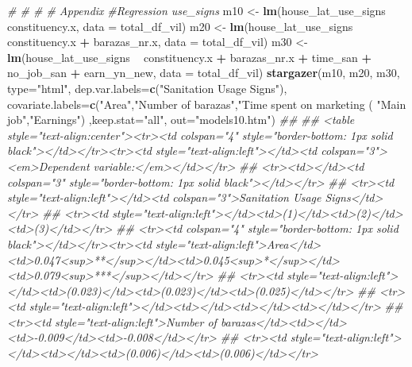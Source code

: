 \documentclass[
]{article}
\newenvironment{Shaded}{\begin{snugshade}}{\end{snugshade}}
\newcommand{\CommentTok}[1]{\textcolor[rgb]{0.56,0.35,0.01}{\textit{#1}}}
\newcommand{\DataTypeTok}[1]{\textcolor[rgb]{0.13,0.29,0.53}{#1}}
\newcommand{\KeywordTok}[1]{\textcolor[rgb]{0.13,0.29,0.53}{\textbf{#1}}}
\newcommand{\NormalTok}[1]{#1}
\newcommand{\OperatorTok}[1]{\textcolor[rgb]{0.81,0.36,0.00}{\textbf{#1}}}
\newcommand{\StringTok}[1]{\textcolor[rgb]{0.31,0.60,0.02}{#1}}
\begin{document}
\begin{Shaded}
\begin{Highlighting}[]
{{{{ \CommentTok{# # # # Appendix}
\CommentTok{#Regression use_signs}
\NormalTok{m10 <-}\StringTok{ }\KeywordTok{lm}\NormalTok{(house_lat_use_signs }\OperatorTok{~}\StringTok{ }\NormalTok{constituency.x,}
          \DataTypeTok{data =}\NormalTok{ total_df_vil)}
\NormalTok{m20 <-}\StringTok{ }\KeywordTok{lm}\NormalTok{(house_lat_use_signs }\OperatorTok{~}\StringTok{ }\NormalTok{constituency.x }\OperatorTok{+}\StringTok{ }\NormalTok{barazas_nr.x,}
          \DataTypeTok{data =}\NormalTok{ total_df_vil)}
\NormalTok{m30 <-}\StringTok{ }\KeywordTok{lm}\NormalTok{(house_lat_use_signs }\OperatorTok{~}\StringTok{ }\NormalTok{constituency.x }\OperatorTok{+}\StringTok{ }\NormalTok{barazas_nr.x }\OperatorTok{+}\StringTok{ }\NormalTok{time_san }\OperatorTok{+}\StringTok{ }\NormalTok{no_job_san }\OperatorTok{+}\StringTok{ }\NormalTok{earn_yn_new,}
          \DataTypeTok{data =}\NormalTok{ total_df_vil)}
\KeywordTok{stargazer}\NormalTok{(m10, m20, m30, }\DataTypeTok{type=}\StringTok{"html"}\NormalTok{,}
          \DataTypeTok{dep.var.labels=}\KeywordTok{c}\NormalTok{(}\StringTok{"Sanitation Usage Signs"}\NormalTok{),}
          \DataTypeTok{covariate.labels=}\KeywordTok{c}\NormalTok{(}\StringTok{"Area"}\NormalTok{,}\StringTok{"Number of barazas"}\NormalTok{,}\StringTok{"Time spent on marketing (%) "}\NormalTok{,}
                             \StringTok{"Main job"}\NormalTok{,}\StringTok{"Earnings"}\NormalTok{) ,}\DataTypeTok{keep.stat=}\StringTok{"all"}\NormalTok{, }\DataTypeTok{out=}\StringTok{"models10.htm"}\NormalTok{)}
\CommentTok{## }
\CommentTok{## <table style="text-align:center"><tr><td colspan="4" style="border-bottom: 1px solid black"></td></tr><tr><td style="text-align:left"></td><td colspan="3"><em>Dependent variable:</em></td></tr>}
\CommentTok{## <tr><td></td><td colspan="3" style="border-bottom: 1px solid black"></td></tr>}
\CommentTok{## <tr><td style="text-align:left"></td><td colspan="3">Sanitation Usage Signs</td></tr>}
\CommentTok{## <tr><td style="text-align:left"></td><td>(1)</td><td>(2)</td><td>(3)</td></tr>}
\CommentTok{## <tr><td colspan="4" style="border-bottom: 1px solid black"></td></tr><tr><td style="text-align:left">Area</td><td>0.047<sup>**</sup></td><td>0.045<sup>*</sup></td><td>0.079<sup>***</sup></td></tr>}
\CommentTok{## <tr><td style="text-align:left"></td><td>(0.023)</td><td>(0.023)</td><td>(0.025)</td></tr>}
\CommentTok{## <tr><td style="text-align:left"></td><td></td><td></td><td></td></tr>}
\CommentTok{## <tr><td style="text-align:left">Number of barazas</td><td></td><td>-0.009</td><td>-0.008</td></tr>}
\CommentTok{## <tr><td style="text-align:left"></td><td></td><td>(0.006)</td><td>(0.006)</td></tr>}
}}}}}
\end{Highlighting}
\end{Shaded}
\end{document}
